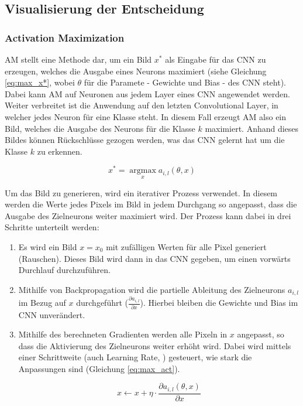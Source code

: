 \newpage
\subsection{Visualisierung der Entscheidung} \label{sec:visAlgos}

\subsubsection{Activation Maximization} \label{sec:actMax}
\ac{AM} stellt eine Methode dar, um ein Bild $x^*$ als Eingabe für das \ac{CNN} zu erzeugen, welches die Ausgabe eines Neurons maximiert (siehe Gleichung \ref{eq:max_x*}, wobei $\theta$ für die Paramete - Gewichte und Bias -  des \ac{CNN} steht). Dabei kann \ac{AM} auf Neuronen aus jedem Layer eines \ac{CNN} angewendet werden. Weiter verbreitet ist die Anwendung auf den letzten Convolutional Layer, in welcher jedes Neuron für eine Klasse steht. In diesem Fall erzeugt \ac{AM} also ein Bild, welches die Ausgabe des Neurons für die Klasse $k$ maximiert. Anhand dieses Bildes können Rückschlüsse gezogen werden, was das \ac{CNN} gelernt hat um die Klasse $k$ zu erkennen.

\begin{equation} \label{eq:max_x*}
    x^{*}=\underset{x}{\operatorname{argmax}} a_{i, l}(\theta, x)
\end{equation}

Um das Bild zu generieren, wird ein iterativer Prozess verwendet. In diesem werden die Werte jedes Pixels im Bild in jedem Durchgang so angepasst, dass die Ausgabe des Zielneurons weiter maximiert wird. Der Prozess kann dabei in drei Schritte unterteilt werden:

\begin{enumerate}
	\item Es wird ein Bild $x = x_0$ mit zufälligen Werten für alle Pixel generiert (Rauschen). Dieses Bild wird dann in das \ac{CNN} gegeben, um einen vorwärts Durchlauf durchzuführen.
    \item Mithilfe von Backpropagation wird die partielle Ableitung des Zielneurons $a_{i,l}$ im Bezug auf $x$ durchgeführt ($\frac{\partial a_{i, l}}{\partial x}$). Hierbei bleiben die Gewichte und Bias im \ac{CNN} unverändert.
    \item Mithilfe des berechneten Gradienten werden alle Pixeln in $x$ angepasst, so dass die Aktivierung des Zielneurons weiter erhöht wird. Dabei wird mittels einer Schrittweite (auch Learning Rate, \eta) gesteuert, wie stark die Anpassungen sind (Gleichung \ref{eq:max_act}).
    
    \begin{equation} \label{eq:max_act}
        x \leftarrow x+\eta \cdot \frac{\partial a_{i, l}(\theta, x)}{\partial x}
    \end{equation}
\end{enumerate}


